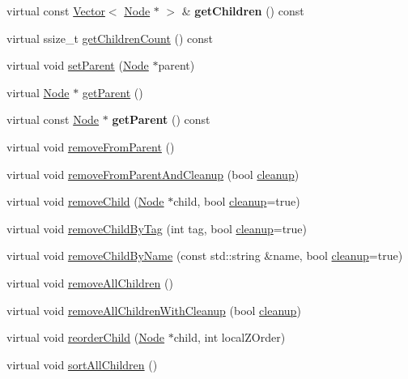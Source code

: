 \begin{DoxyCompactItemize}
\item 
\mbox{\label{classNode_aedc8104d257021771119ffeb4c171bb3}} 
virtual const \hyperlink{classVector}{Vector}$<$ \hyperlink{classNode}{Node} $\ast$ $>$ \& {\bfseries get\+Children} () const
\item 
virtual ssize\+\_\+t \hyperlink{classNode_a2ae0db7fcb1347684d462a873944b534}{get\+Children\+Count} () const
\item 
virtual void \hyperlink{classNode_ac4d4495d7ca6de96a2ce4dbc63514022}{set\+Parent} (\hyperlink{classNode}{Node} $\ast$parent)
\item 
virtual \hyperlink{classNode}{Node} $\ast$ \hyperlink{classNode_af4c8a4ae726c6dd984db05c89454652d}{get\+Parent} ()
\item 
\mbox{\label{classNode_a76fd4c36007f3da331591de601dfa377}} 
virtual const \hyperlink{classNode}{Node} $\ast$ {\bfseries get\+Parent} () const
\item 
virtual void \hyperlink{classNode_a9a2cf07d3723b1394d8943e24a785704}{remove\+From\+Parent} ()
\item 
virtual void \hyperlink{classNode_ab22d0fe060ea35fba5eee6fe2fba5f42}{remove\+From\+Parent\+And\+Cleanup} (bool \hyperlink{classNode_aa2de84c6cdeec9cd647d236c30ee0567}{cleanup})
\item 
virtual void \hyperlink{classNode_ae2e85ab2de9e93e3998a40df1b4b61fc}{remove\+Child} (\hyperlink{classNode}{Node} $\ast$child, bool \hyperlink{classNode_aa2de84c6cdeec9cd647d236c30ee0567}{cleanup}=true)
\item 
virtual void \hyperlink{classNode_a7d2e9aae23d04f4355eadd5d38bc6200}{remove\+Child\+By\+Tag} (int tag, bool \hyperlink{classNode_aa2de84c6cdeec9cd647d236c30ee0567}{cleanup}=true)
\item 
virtual void \hyperlink{classNode_a70e99fad1cb0a446e9d2bfeefd8b115f}{remove\+Child\+By\+Name} (const std\+::string \&name, bool \hyperlink{classNode_aa2de84c6cdeec9cd647d236c30ee0567}{cleanup}=true)
\item 
virtual void \hyperlink{classNode_a4018ec946225eb3bc64a0bbd19cd4625}{remove\+All\+Children} ()
\item 
virtual void \hyperlink{classNode_a0e179356e2ffbff60f02149b35edacc1}{remove\+All\+Children\+With\+Cleanup} (bool \hyperlink{classNode_aa2de84c6cdeec9cd647d236c30ee0567}{cleanup})
\item 
virtual void \hyperlink{classNode_a3bbfa613acd0eba2e67ae8274e8114ee}{reorder\+Child} (\hyperlink{classNode}{Node} $\ast$child, int local\+Z\+Order)
\item 
virtual void \hyperlink{classNode_a5911e98e2230b164daf283f707e1748d}{sort\+All\+Children} ()
\end{DoxyCompactItemize}


